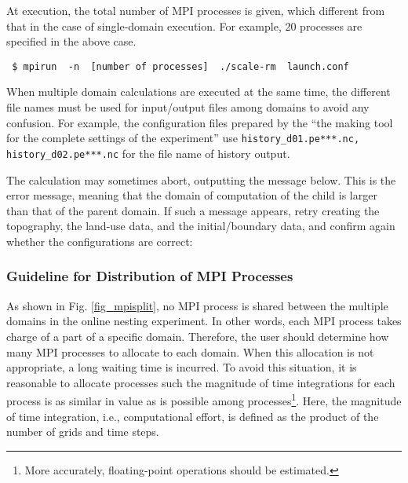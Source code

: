 At execution, the total number of MPI processes is given, which different from that in the case of single-domain execution. For example, 20 processes are specified in the above case.
\begin{verbatim}
 $ mpirun  -n  [number of processes]  ./scale-rm  launch.conf
\end{verbatim}

When multiple domain calculations are executed at the same time,
the different file names must be used for input/output files
among domains to avoid any confusion.
For example, the configuration files prepared by the 
``the making tool for the complete settings of the experiment''
use \verb|history_d01.pe***.nc, history_d02.pe***.nc| for the file name of history output.

The calculation may sometimes abort, outputting the message below. This is the error message, meaning that the domain of computation of the child  is larger than that of the parent domain. If such a message appears, retry creating the topography, the land-use data, and the initial/boundary data, and confirm again whether the configurations are correct:


\subsubsection{Guideline for Distribution of MPI Processes}

As shown in Fig. \ref{fig_mpisplit}, no MPI process is shared between the multiple domains in the online nesting experiment. In other words, each MPI process takes charge of a part of a specific domain. Therefore, the user should determine how many MPI processes to allocate to each domain. When this allocation is not appropriate, a long waiting time is incurred. To avoid this situation, it is reasonable to allocate processes such the magnitude of time integrations for each process is as similar in value as is possible among processes\footnote{More accurately, floating-point operations should be estimated.}. Here, the magnitude of time integration, i.e., computational effort, is defined as the product of the number of grids and time steps.


